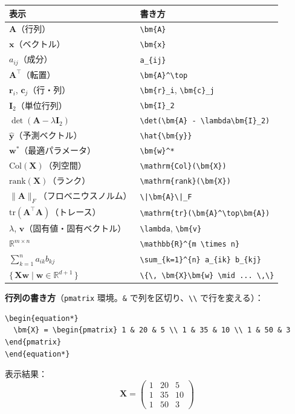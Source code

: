 \documentclass[a4paper,dvipdfmx]{jsarticle}
\newcommand{\提出期限}{2026年10月12日（月）}
\newcommand{\学籍番号}{0000000}
\newcommand{\氏名}{氏名を書く}
\newcommand{\提出日}{2026年10月12日}
\begin{document}
\begin{center}
\small
\begin{tabular}{l|l}
\hline
表示 & 書き方 \\
\hline\hline
$\bm{A}$（行列） & \verb|\bm{A}| \\
$\bm{x}$（ベクトル） & \verb|\bm{x}| \\
$a_{ij}$（成分） & \verb|a_{ij}| \\
$\bm{A}^\top$（転置） & \verb|\bm{A}^\top| \\
$\bm{r}_i$, $\bm{c}_j$（行・列） & \verb|\bm{r}_i|, \verb|\bm{c}_j| \\
$\bm{I}_2$（単位行列） & \verb|\bm{I}_2| \\
$\det(\bm{A} - \lambda\bm{I}_2)$ & \verb|\det(\bm{A} - \lambda\bm{I}_2)| \\
$\hat{\bm{y}}$（予測ベクトル） & \verb|\hat{\bm{y}}| \\
$\bm{w}^*$（最適パラメータ） & \verb|\bm{w}^*| \\
$\mathrm{Col}(\bm{X})$（列空間） & \verb|\mathrm{Col}(\bm{X})| \\
$\mathrm{rank}(\bm{X})$（ランク） & \verb|\mathrm{rank}(\bm{X})| \\
$\|\bm{A}\|_F$（フロベニウスノルム） & \verb+\|\bm{A}\|_F+ \\
$\mathrm{tr}(\bm{A}^\top\bm{A})$（トレース） & \verb|\mathrm{tr}(\bm{A}^\top\bm{A})| \\
$\lambda$, $\bm{v}$（固有値・固有ベクトル） & \verb|\lambda|, \verb|\bm{v}| \\
$\mathbb{R}^{m \times n}$ & \verb|\mathbb{R}^{m \times n}| \\
$\displaystyle\sum_{k=1}^{n} a_{ik} b_{kj}$ & \verb|\sum_{k=1}^{n} a_{ik} b_{kj}| \\
$\{\, \bm{X}\bm{w} \mid \bm{w} \in \mathbb{R}^{d+1} \,\}$ & \verb+\{\, \bm{X}\bm{w} \mid ... \,\}+ \\
\hline
\end{tabular}
\end{center}

\noindent
\textbf{行列の書き方}（\verb|pmatrix| 環境。\verb|&| で列を区切り、\verb|\\| で行を変える）：
\begin{verbatim}
\begin{equation*}
  \bm{X} = \begin{pmatrix} 1 & 20 & 5 \\ 1 & 35 & 10 \\ 1 & 50 & 3 \end{pmatrix}
\end{equation*}
\end{verbatim}
表示結果：
\begin{equation*}
  \bm{X} = \begin{pmatrix} 1 & 20 & 5 \\ 1 & 35 & 10 \\ 1 & 50 & 3 \end{pmatrix}
\end{equation*}
\end{document}
